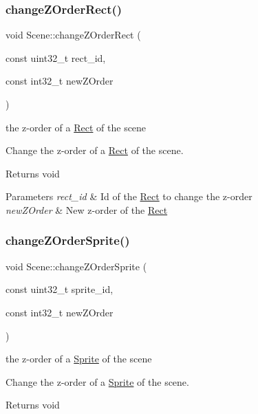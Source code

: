 \subsubsection{\texorpdfstring{change\+Z\+Order\+Rect()}{changeZOrderRect()}}
{\footnotesize\ttfamily void Scene\+::change\+Z\+Order\+Rect (\begin{DoxyParamCaption}\item[{const uint32\+\_\+t}]{rect\+\_\+id,  }\item[{const int32\+\_\+t}]{new\+Z\+Order }\end{DoxyParamCaption})}

the z-\/order of a \hyperlink{class_rect}{Rect} of the scene

Change the z-\/order of a \hyperlink{class_rect}{Rect} of the scene.

\begin{DoxyReturn}{Returns}
void 
\end{DoxyReturn}

\begin{DoxyParams}{Parameters}
{\em rect\+\_\+id} & Id of the \hyperlink{class_rect}{Rect} to change the z-\/order \\
\hline
{\em new\+Z\+Order} & New z-\/order of the \hyperlink{class_rect}{Rect} \\
\hline
\end{DoxyParams}
\mbox{\label{class_scene_a3913b5c955c938f6bbd84d3e78bebcad}} 
\subsubsection{\texorpdfstring{change\+Z\+Order\+Sprite()}{changeZOrderSprite()}}
{\footnotesize\ttfamily void Scene\+::change\+Z\+Order\+Sprite (\begin{DoxyParamCaption}\item[{const uint32\+\_\+t}]{sprite\+\_\+id,  }\item[{const int32\+\_\+t}]{new\+Z\+Order }\end{DoxyParamCaption})}

the z-\/order of a \hyperlink{class_sprite}{Sprite} of the scene

Change the z-\/order of a \hyperlink{class_sprite}{Sprite} of the scene.

\begin{DoxyReturn}{Returns}
void 
\end{DoxyReturn}

